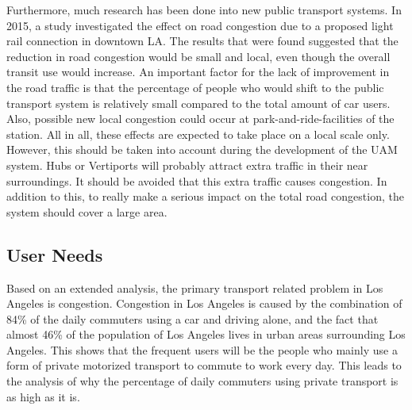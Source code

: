 Furthermore, much research has been done into new public transport systems. In 2015, a study \cite{lightrail} investigated the effect on road congestion due to a proposed light rail connection in downtown LA. The results that were found suggested that the reduction in road congestion would be small and local, even though the overall transit use would increase. An important factor for the lack of improvement in the road traffic is that the percentage of people who would shift to the public transport system is relatively small compared to the total amount of car users. Also, possible new local congestion could occur at park-and-ride-facilities of the station. All in all, these effects are expected to take place on a local scale only. However, this should be taken into account during the development of the UAM system. Hubs or Vertiports will probably attract extra traffic in their near surroundings. It should be avoided that this extra traffic causes congestion. In addition to this, to really make a serious impact on the total road congestion, the system should cover a large area. 

\subsection{User Needs}
Based on an extended analysis, the primary transport related problem in Los Angeles is congestion. Congestion in Los Angeles is caused by the combination of 84\% of the daily commuters using a car and driving alone, and the fact that almost 46\% of the population of Los Angeles lives in urban areas surrounding Los Angeles. This shows that the frequent users will be the people who mainly use a form of private motorized transport to commute to work every day. This leads to the analysis of why the percentage of daily commuters using private transport is as high as it is. 

